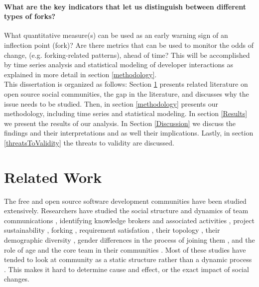 \documentclass[12pt]{report}
\begin{document}
\paragraph*{\hspace{4 mm} What are the key indicators that let us distinguish between different types of forks?\\}

What quantitative measure(s) can be used as an early warning sign of an inflection point (fork)? Are there metrics that can be used to monitor the odds of change, (e.g. forking-related patterns), ahead of time? This will be accomplished by time series analysis and statistical modeling of developer interactions as explained in more detail in section \ref{methodology}.\\

This dissertation is organized as follows: Section \ref{relatedwork} presents related literature on open source social communities, the gap in the literature, and discusses why the issue needs to be studied. Then, in section \ref{methodology} presents our methodology, including time series and statistical modeling. In section \ref{Results} we present the results of our analysis. In Section \ref{Discussion} we discuss the findings and their interpretations and as well their implications. Lastly, in section \ref{threatsToValidity} the threats to validity are discussed.

\section{Related Work}
\label{relatedwork}

The free and open source software development communities have been studied extensively. Researchers have studied the social structure and dynamics of team communications \cite{Bird}\cite{Guzzi}\cite{HowisonSocialDynamics}\cite{HowisonFlossMole}\cite{Nakakoji}, identifying knowledge brokers and associated activities \cite{Sowe}, project sustainability \cite{Nakakoji}\cite{NymanForkingSustainability}, forking \cite{NymanCodeForking}, requirement satisfation \cite{Ernst}, their topology \cite{Bird}, their demographic diversity \cite{Kunegis}, gender differences in the process of joining them \cite{Kuechler}, and the role of age and the core team in their communities \cite{AzarbakhtOSS2014}\cite{AzarbakhtINSNA2014}\cite{DavidsonVLHCC2014}\cite{Torres}. Most of these studies have tended to look at community as a static structure rather than a dynamic process \cite{CrowstonFLOSSWhatWeKnow}. This makes it hard to determine cause and effect, or the exact impact of social changes.
\end{document}
